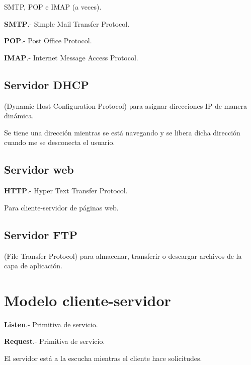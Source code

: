 \documentclass{article}
\begin{document}
SMTP, POP e IMAP (a veces).
\vspace{1em}

\textbf{SMTP}.- Simple Mail Transfer Protocol.
\vspace{1em}

\textbf{POP}.- Post Office Protocol.
\vspace{1em}

\textbf{IMAP}.- Internet Message Access Protocol.
\vspace{1em}

\subsection{Servidor DHCP}

(Dynamic Host Configuration Protocol) para asignar direcciones IP de manera dinámica.
\vspace{1em}

Se tiene una dirección mientras se está navegando y se libera dicha dirección cuando
me se desconecta el usuario.
\vspace{1em}

\subsection{Servidor web}

\textbf{HTTP}.- Hyper Text Transfer Protocol.
\vspace{1em}

Para cliente-servidor de páginas web.
\vspace{1em}

\subsection{Servidor FTP}

(File Transfer Protocol) para almacenar, transferir o descargar archivos de la capa de aplicación.
\vspace{1em}

\section{Modelo cliente-servidor}

\textbf{Listen}.- Primitiva de servicio.
\vspace{1em}

\textbf{Request}.- Primitiva de servicio.
\vspace{1em}

El servidor está a la escucha mientras el cliente hace solicitudes.
\end{document}
